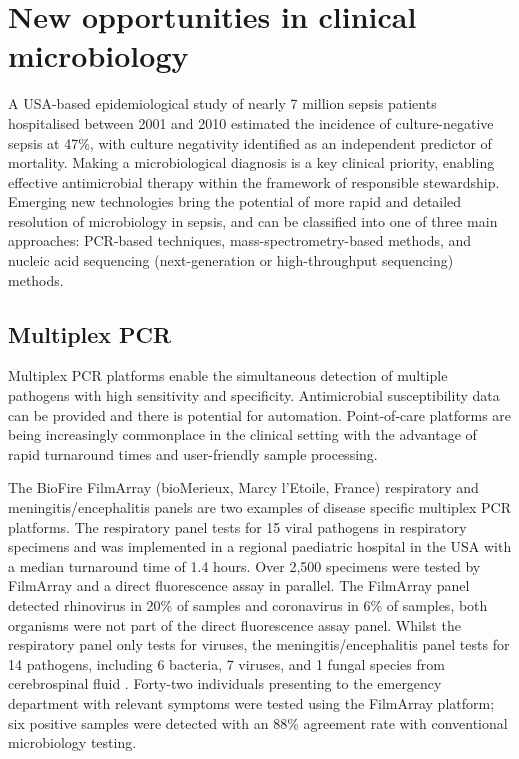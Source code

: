 \section{New opportunities in clinical microbiology}
A USA-based epidemiological study \parencite{Gupta2016} of nearly 7 million sepsis patients hospitalised between 2001 and 2010 estimated the incidence of culture-negative sepsis at 47\%, with culture negativity identified as an independent predictor of mortality. Making a microbiological diagnosis is a key clinical priority, enabling effective antimicrobial therapy within the framework of responsible stewardship. Emerging new technologies bring the potential of more rapid and detailed resolution of microbiology in sepsis, and can be classified into one of three main approaches: PCR-based techniques, mass-spectrometry-based methods, and nucleic acid sequencing (next-generation or high-throughput sequencing) methods.

\subsection{Multiplex PCR}
Multiplex PCR platforms enable the simultaneous detection of multiple pathogens with high sensitivity and specificity. Antimicrobial susceptibility data can be provided and there is potential for automation. Point-of-care platforms are being increasingly commonplace in the clinical setting with the advantage of rapid turnaround times and user-friendly sample processing. 

The BioFire FilmArray (bioMerieux, Marcy l'Etoile, France) respiratory \parencite{Xu2013} and meningitis/encephalitis \parencite{Lee2019} panels are two examples of disease specific multiplex PCR platforms. The respiratory panel \parencite{Xu2013} tests for 15 viral pathogens in respiratory specimens and was implemented in a regional paediatric hospital in the USA with a median turnaround time of 1.4 hours. Over 2,500 specimens were tested by FilmArray and a direct fluorescence assay in parallel. The FilmArray panel detected rhinovirus in 20\% of samples and coronavirus in 6\% of samples, both organisms were not part of the direct fluorescence assay panel. Whilst the respiratory panel only tests for viruses, the meningitis/encephalitis panel tests for 14 pathogens, including 6 bacteria, 7 viruses, and 1 fungal species from cerebrospinal fluid \parencite{Lee2019}. Forty-two individuals presenting to the emergency department with relevant symptoms were tested using the FilmArray platform; six positive samples were detected with an 88\% agreement rate with conventional microbiology testing.

